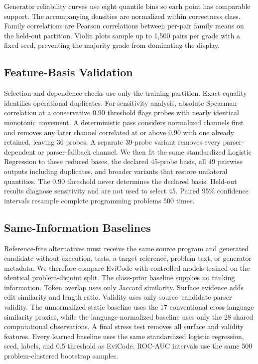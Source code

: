 \documentclass[conference]{IEEEtran}
\begin{document}
Generator reliability curves use eight quantile bins so each point has comparable support. The accompanying densities are normalized within correctness class. Family correlations are Pearson correlations between per-pair family means on the held-out partition. Violin plots sample up to 1,500 pairs per grade with a fixed seed, preventing the majority grade from dominating the display.

\subsection{Feature-Basis Validation}
Selection and dependence checks use only the training partition. Exact equality identifies operational duplicates. For sensitivity analysis, absolute Spearman correlation at a conservative 0.90 threshold flags probes with nearly identical monotonic movement. A deterministic pass considers normalized channels first and removes any later channel correlated at or above 0.90 with one already retained, leaving 36 probes. A separate 39-probe variant removes every parser-dependent or parser-fallback channel. We then fit the same standardized Logistic Regression to these reduced bases, the declared 45-probe basis, all 49 pairwise outputs including duplicates, and broader variants that restore unilateral quantities. The 0.90 threshold never determines the declared basis. Held-out results diagnose sensitivity and are not used to select 45. Paired 95\% confidence intervals resample complete programming problems 500 times.

\subsection{Same-Information Baselines}
Reference-free alternatives must receive the same source program and generated candidate without execution, tests, a target reference, problem text, or generator metadata. We therefore compare EviCode with controlled models trained on the identical problem-disjoint split. The class-prior baseline supplies no ranking information. Token overlap uses only Jaccard similarity. Surface evidence adds edit similarity and length ratio. Validity uses only source--candidate parser validity. The unnormalized-static baseline uses the 17 conventional cross-language similarity proxies, while the language-normalized baseline uses only the 28 shared computational observations. A final stress test removes all surface and validity features. Every learned baseline uses the same standardized logistic regression, seed, labels, and 0.5 threshold as EviCode. ROC-AUC intervals use the same 500 problem-clustered bootstrap samples.
\end{document}
